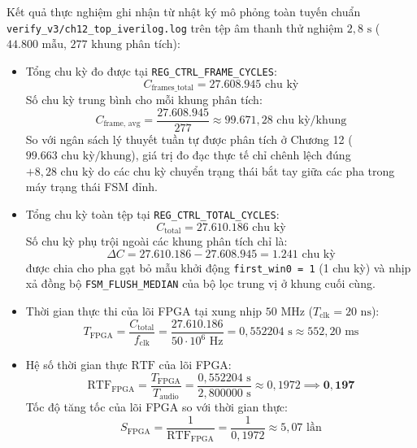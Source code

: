 Kết quả thực nghiệm ghi nhận từ nhật ký mô phỏng toàn tuyến chuẩn \texttt{verify\_v3/ch12\_top\_iverilog.log} trên tệp âm thanh thử nghiệm $2{,}8\text{ s}$ ($44.800\text{ mẫu}$, $277\text{ khung}$ phân tích):
\begin{itemize}
    \item Tổng chu kỳ đo được tại \texttt{REG\_CTRL\_FRAME\_CYCLES}:
    \begin{equation}
        C_{\text{frames\_total}} = 27.608.945\text{ chu kỳ}
    \end{equation}
    Số chu kỳ trung bình cho mỗi khung phân tích:
    \begin{equation}
        C_{\text{frame, avg}} = \frac{27.608.945}{277} \approx 99.671{,}28\text{ chu kỳ/khung}
    \end{equation}
    So với ngân sách lý thuyết tuần tự được phân tích ở Chương 12 ($99.663\text{ chu kỳ/khung}$), giá trị đo đạc thực tế chỉ chênh lệch đúng $+8{,}28\text{ chu kỳ}$ do các chu kỳ chuyển trạng thái bắt tay giữa các pha trong máy trạng thái FSM đỉnh.
    
    \item Tổng chu kỳ toàn tệp tại \texttt{REG\_CTRL\_TOTAL\_CYCLES}:
    \begin{equation}
        C_{\text{total}} = 27.610.186\text{ chu kỳ}
    \end{equation}
    Số chu kỳ phụ trội ngoài các khung phân tích chỉ là:
    \begin{equation}
        \Delta C = 27.610.186 - 27.608.945 = 1.241\text{ chu kỳ}
    \end{equation}
    được chia cho pha gạt bỏ mẫu khởi động \texttt{first\_win0 = 1} (1 chu kỳ) và nhịp xả đồng bộ \texttt{FSM\_FLUSH\_MEDIAN} của bộ lọc trung vị ở khung cuối cùng.

    \item Thời gian thực thi của lõi FPGA tại xung nhịp $50\text{ MHz}$ ($T_{\text{clk}} = 20\text{ ns}$):
    \begin{equation}
        T_{\text{FPGA}} = \frac{C_{\text{total}}}{f_{\text{clk}}} = \frac{27.610.186}{50 \cdot 10^6\text{ Hz}} = 0{,}552204\text{ s} \approx 552{,}20\text{ ms}
    \end{equation}

    \item Hệ số thời gian thực $\text{RTF}$ của lõi FPGA:
    \begin{equation}
        \text{RTF}_{\text{FPGA}} = \frac{T_{\text{FPGA}}}{T_{\text{audio}}} = \frac{0{,}552204\text{ s}}{2{,}800000\text{ s}} \approx 0{,}1972 \implies \mathbf{0{,}197}
    \end{equation}
    Tốc độ tăng tốc của lõi FPGA so với thời gian thực:
    \begin{equation}
        S_{\text{FPGA}} = \frac{1}{\text{RTF}_{\text{FPGA}}} = \frac{1}{0{,}1972} \approx 5{,}07\text{ lần}
    \end{equation}
\end{itemize}

